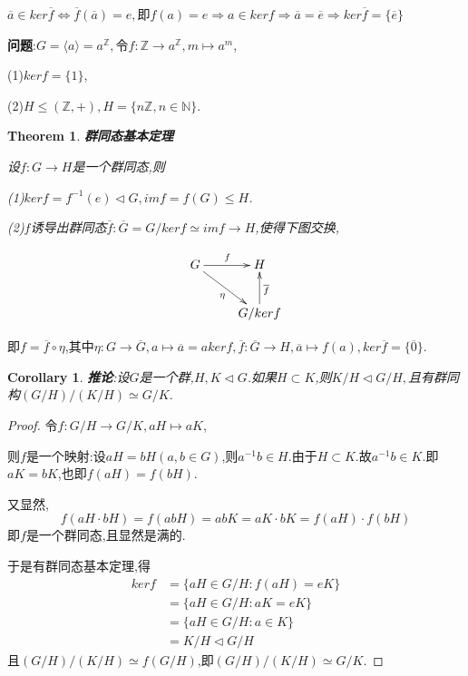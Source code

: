 \documentclass[UTF8]{article}
\newtheorem{thm}{Theorem}[section]
\newtheorem{cor}{Corollary}[section]
\begin{document}
$\overline{a}\in ker \overline{f}\Leftrightarrow \overline{f}(\overline{a})=e,$即$f(a)=e\Rightarrow a\in ker f\Rightarrow \overline{a}=\overline{e}\Rightarrow ker \overline{f}=\{\overline{e}\}$

\textbf{问题}:$G=\langle a\rangle=a^\mathbb{Z},$令$f:\mathbb{Z}\to a^\mathbb{Z},m\mapsto a^m$,

(1)$ker f=\{1\}$,

(2)$H\le (\mathbb{Z},+),H=\{n\mathbb{Z},n\in \mathbb{N}\}$.

\begin{thm}
	\textbf{群同态基本定理}
	
	设$f:G\to H$是一个群同态,则
	
	(1)$ker f=f^{-1}(e)\triangleleft G,im f=f(G)\le H$.
	
	(2)$f$诱导出群同态$\overline{f}:\overline{G}=G/ker f\simeq imf\to H$,使得下图交换,
\end{thm}

\begin{displaymath}
\xymatrix{G \ar[dr]_{\eta} \ar[r]^{f} & H \\
	& G/kerf \ar[u]_{\overline{f}}}
\end{displaymath}

即$f=\overline{f}\circ\eta$,其中$\eta:G\to\overline{G},a\mapsto\overline{a}=aker f,\overline{f}:\overline{G}\to H,\overline{a}\mapsto f(a),ker \overline{f}=\{\overline{0}\}$.

\begin{cor}
	\textbf{推论}:设$G$是一个群,$H,K\triangleleft G$.如果$H\subset K$,则$K/H\triangleleft G/H,$且有群同构$(G/H)/(K/H)\simeq G/K.$
\end{cor}
\begin{proof} 
	令$f:G/H\to G/K,aH\mapsto aK$,
	
	则$f$是一个映射:设$aH=bH(a,b\in G)$,则$a^{-1}b\in H.$由于$H\subset K.$故$a^{-1}b\in K.$即$aK=bK$,也即$f(aH)=f(bH)$.
	
	又显然,$$f(aH\cdot bH)=f(abH)=abK=aK\cdot bK=f(aH)\cdot f(bH)$$
	即$f$是一个群同态,且显然是满的.
	
	于是有群同态基本定理,得     
	\[
	\begin{split}
	kerf&=\{aH\in G/H:f(aH)=eK\}\\
	&=\{aH\in G/H:aK=eK\}\\
	&=\{aH\in G/H:a\in K\}\\
	&=K/H\triangleleft G/H
	\end{split}
	\]
	且$(G/H)/(K/H)\simeq f(G/H)$,即$(G/H)/(K/H)\simeq G/K$.
\end{proof}
\end{document}
